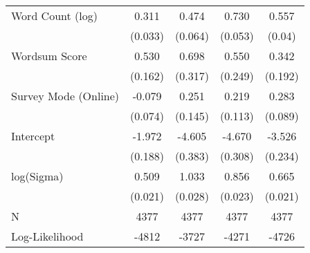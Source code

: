 \begin{table}[ht]
\begin{tabular}{lcccc}
  Word Count (log) &  0.311 &  0.474 &  0.730 &  0.557 \\ 
   & (0.033) & (0.064) & (0.053) & (0.04) \\ 
  Wordsum Score &  0.530 &  0.698 &  0.550 &  0.342 \\ 
   & (0.162) & (0.317) & (0.249) & (0.192) \\ 
  Survey Mode (Online) & -0.079 &  0.251 &  0.219 &  0.283 \\ 
   & (0.074) & (0.145) & (0.113) & (0.089) \\ 
  Intercept & -1.972 & -4.605 & -4.670 & -3.526 \\ 
   & (0.188) & (0.383) & (0.308) & (0.234) \\ 
  log(Sigma) &  0.509 &  1.033 &  0.856 &  0.665 \\ 
   & (0.021) & (0.028) & (0.023) & (0.021) \\ 
   \hline
N & 4377 & 4377 & 4377 & 4377 \\ 
  Log-Likelihood & -4812 & -3727 & -4271 & -4726 \\ 
   \hline
\end{tabular}
\endgroup
\end{table}
